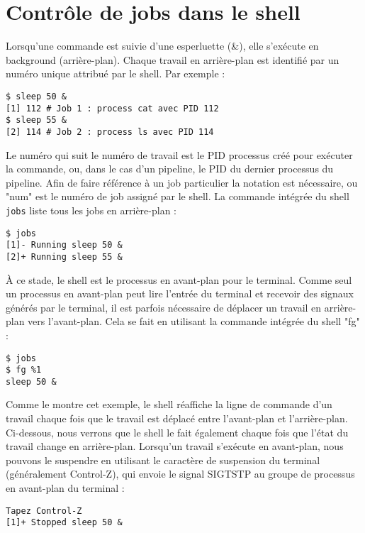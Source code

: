 \section{Contrôle de jobs dans le shell}

Lorsqu'une commande est suivie d'une esperluette (\&), elle s'exécute en background (arrière-plan). 
Chaque travail en arrière-plan est identifié par un numéro unique attribué par le shell. Par exemple :

\begin{lstlisting}[style=blackstyle]
$ sleep 50 & 
[1] 112	# Job 1 : process cat avec PID 112
$ sleep 55 &
[2] 114	# Job 2 : process ls avec PID 114
\end{lstlisting}
Le numéro qui suit le numéro de travail est le PID processus créé pour exécuter la commande, 
ou, dans le cas d'un pipeline, le PID du dernier processus du pipeline. Afin de faire référence à un job
particulier la notation \texttt{} est nécessaire, ou "num" est le numéro de job assigné par le shell.
\newline
\newline
La commande intégrée du shell \texttt{jobs} liste tous les jobs en arrière-plan :
\begin{lstlisting}[style=blackstyle]
$ jobs
[1]- Running sleep 50 & 
[2]+ Running sleep 55 &
\end{lstlisting}

À ce stade, le shell est le processus en avant-plan pour le terminal. Comme seul un processus en avant-plan peut lire l'entrée du terminal et recevoir 
des signaux générés par le terminal, il est parfois nécessaire de déplacer un travail en arrière-plan vers l'avant-plan. 
Cela se fait en utilisant la commande intégrée du shell "fg" :
\begin{lstlisting}[style=blackstyle]
$ jobs
$ fg %1
sleep 50 & 
\end{lstlisting}

Comme le montre cet exemple, le shell réaffiche la ligne de commande d'un travail chaque fois que le travail est déplacé entre l'avant-plan 
et l'arrière-plan. Ci-dessous, nous verrons que le shell le fait également chaque fois que l'état du travail change en arrière-plan.
\newline
Lorsqu'un travail s'exécute en avant-plan, nous pouvons le suspendre en utilisant le caractère de suspension du terminal 
(généralement Control-Z), qui envoie le signal SIGTSTP au groupe de processus en avant-plan du terminal :
\begin{lstlisting}[style=blackstyle]
Tapez Control-Z
[1]+ Stopped sleep 50 & 
\end{lstlisting}

